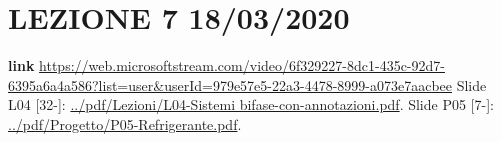 \section*{LEZIONE 7 18/03/2020}
\textbf{link} \url{https://web.microsoftstream.com/video/6f329227-8dc1-435c-92d7-6395a6a4a586?list=user&userId=979e57e5-22a3-4478-8999-a073e7aacbee}\newline
\newline
Slide L04 [32-]: \url{../pdf/Lezioni/L04-Sistemi bifase-con-annotazioni.pdf}.\newline
\newline
Slide P05 [7-]: \url{../pdf/Progetto/P05-Refrigerante.pdf}.\newline
\newline





